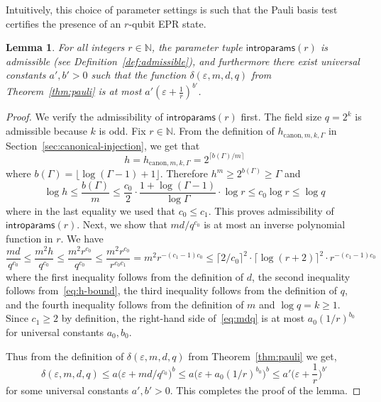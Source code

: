 \documentclass[11pt]{article}
\newtheorem{lemma}[theorem]{Lemma}
\theoremstyle{definition}
\newcommand{\N}{\ensuremath{\mathbb{N}}}
\newcommand{\eps}{\varepsilon}
\newcommand{\introparams}{\mathsf{introparams}}
\newcommand{\canlilh}[3]{h_{\mathrm{canon}, #1, #2, #3}}
\begin{document}
Intuitively, this choice of parameter settings is such that the Pauli basis test
certifies the presence of an $r$-qubit EPR state.

\begin{lemma}
  \label{lem:delta-bound}
  For all integers $r \in \N$, the parameter tuple $\introparams(r)$ is
  admissible (see Definition~\ref{def:admissible}), and furthermore there exist
  universal constants $a',b' > 0$ such that the function $\delta(\eps, m, d, q)$
  from Theorem~\ref{thm:pauli} is at most $a' (\eps + \frac{1}{r})^{b'}$.
\end{lemma}

\begin{proof}
  We verify the admissibility of $\introparams(r)$ first.
  The field size $q = 2^k$ is admissible because $k$ is odd.
  Fix $r \in \N$.
  From the definition of $\canlilh{m}{k}{\Gamma}$ in
  Section~\ref{sec:canonical-injection}, we get that
  \[
    h = \canlilh{m}{k}{\Gamma} = 2^{\lceil b(\Gamma)/m \rceil}
  \]
  where $b(\Gamma) = \lfloor \log (\Gamma - 1) + 1 \rfloor$.
  Therefore $h^m \geq 2^{b(\Gamma)} \geq \Gamma$ and
  \begin{equation}
    \label{eq:h-bound}
    \log h \leq \frac{b(\Gamma)}{m} \leq \frac{c_0}{2} \cdot
    \frac{1 + \log (\Gamma-1)}{\log \Gamma} \cdot
    \log r \leq c_0 \log r \leq \log q
  \end{equation}
  where in the last equality we used that $c_0 \leq c_1$.
  This proves admissibility of $\introparams(r)$.
  Next, we show that $md/q^{c_0}$ is at most an inverse polynomial function in
  $r$.
  We have
  \begin{equation}
    \label{eq:mdq}
    \frac{md}{q^{c_0}} \leq \frac{m^2 h}{q^{c_0}} \leq
    \frac{m^2 r^{c_0}}{q^{c_0}} \leq \frac{m^2 r^{c_0}}{r^{c_0 c_1}} =
    m^2 r^{-(c_1 - 1)c_0} \leq \lceil 2/c_0 \rceil^2 \cdot
    \lceil \log (r+2) \rceil^2 \cdot r^{-(c_1 - 1)c_0}
  \end{equation}
  where the first inequality follows from the definition of $d$, the second
  inequality follows from~\eqref{eq:h-bound}, the third inequality follows from
  the definition of $q$, and the fourth inequality follows from the definition
  of $m$ and $\log q=k \geq 1$.
  Since $c_1 \geq 2$ by definition, the right-hand side of~\eqref{eq:mdq} is at
  most $a_0 (1/r)^{b_0}$ for universal constants $a_0,b_0$.

  Thus from the definition of $\delta(\eps, m, d, q)$ from
  Theorem~\ref{thm:pauli} we get,
  \[
    \delta(\eps,m,d,q) \leq a\Big ( \eps + md/q^{c_0} \Big)^{b} \leq
    a \Big ( \eps + a_0 (1/r)^{b_0} \Big)^{b} \leq
    a' \Big ( \eps + \frac{1}{r} \Big)^{b'}
  \]
  for some universal constants $a', b' > 0$.
  This completes the proof of the lemma.
\end{proof}
\end{document}
